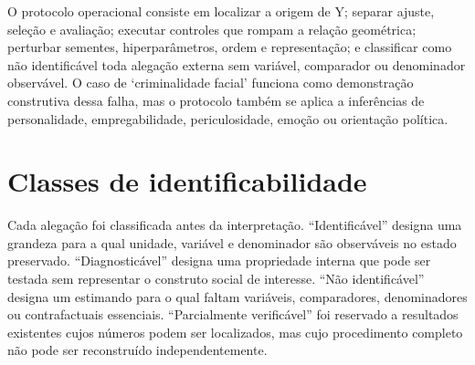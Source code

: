 O protocolo operacional consiste em localizar a origem de Y; separar ajuste, seleção e avaliação; executar controles que rompam a relação geométrica; perturbar sementes, hiperparâmetros, ordem e representação; e classificar como não identificável toda alegação externa sem variável, comparador ou denominador observável. O caso de `criminalidade facial' funciona como demonstração construtiva dessa falha, mas o protocolo também se aplica a inferências de personalidade, empregabilidade, periculosidade, emoção ou orientação política.

\section{Classes de identificabilidade}

Cada alegação foi classificada antes da interpretação. ``Identificável'' designa uma grandeza para a qual unidade, variável e denominador são observáveis no estado preservado. ``Diagnosticável'' designa uma propriedade interna que pode ser testada sem representar o construto social de interesse. ``Não identificável'' designa um estimando para o qual faltam variáveis, comparadores, denominadores ou contrafactuais essenciais. ``Parcialmente verificável'' foi reservado a resultados existentes cujos números podem ser localizados, mas cujo procedimento completo não pode ser reconstruído independentemente.


